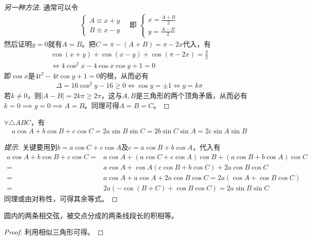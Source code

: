 \begin{proof}[另一种方法]
  通常可以令
  \begin{align*}
    \begin{cases}
      A\equiv x+y\\
      B\equiv x-y
    \end{cases}\quad\text{即\ }
    \begin{cases}
      x = \frac{A+B}{2}\\
      y = \frac{A-B}{2}
    \end{cases}
  \end{align*}
  然后证明$y=0$就有$A=B$。把$C=\pi - (A+B) = \pi - 2x$代入，有
  \begin{align*}
    \cos(x+y) + \cos(x-y) + \cos(\pi - 2x) = \frac32 \\
    \iff 4\cos^2x -4\cos x\cos y + 1 = 0
  \end{align*}
  即$\cos x$是$4t^2 - 4t\cos y + 1=0$的根，从而必有
  \begin{align*}
    \Delta = 16\cos^2y - 16 \ge 0 \iff \cos y = \pm 1 \iff y=k\pi
  \end{align*}
  若$k\ne 0$，则$|A-B| = 2k\pi\ge 2\pi$，这与$A,B$是三角形的两个顶角矛盾，从而必有$k=0\implies y=0\implies A=B$。同理可得$A=B=C$。
\end{proof}

\begin{example}
  $\forall \triangle ABC$，有
  \begin{align*}
    a\cos A + b\cos B + c\cos C = 2a\sin B\sin C = 2b\sin C\sin A=2c\sin A\sin B
  \end{align*}
\end{example}
\begin{proof}[提示]
  关键要用到$b = a\cos C + c\cos A$及$c = a\cos B + b\cos A$，代入有
  \begin{align*}
    a\cos A + b\cos B + c\cos C ={}& a\cos A + (a\cos C+c\cos A)\cos B + (a\cos B+b\cos A)\cos C \\
    ={}& a\cos A + \cos A(c\cos B + b\cos C) + 2a\cos B\cos C\\
    ={}& a\cos A + a\cos A + 2a\cos B\cos C = 2a(\cos A + \cos B\cos C)\\
    ={}& 2a(-\cos(B+C) + \cos B\cos C) = 2a\sin B\sin C
  \end{align*}
  同理或由对称性，可得其余等式。
\end{proof}


\begin{theorem}
  圆内的两条相交弦，被交点分成的两条线段长的积相等。
\end{theorem}
\begin{proof}
  利用相似三角形可得。
\end{proof}

